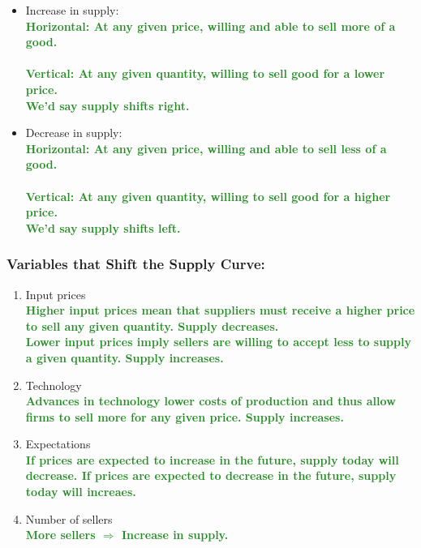 \documentclass[11pt]{article}\usepackage[]{graphicx}\usepackage[]{color}
\theoremstyle{definition}
\newcommand{\ddp}[1]{{\textbf{\textcolor{ForestGreen}{#1}}}}
\begin{document}
	\begin{itemize}
		\setlength{\itemsep}{1.5em}
		\item Increase in supply: \ddp{\\ Horizontal: At any given price, willing and able to sell more of a good. \\ \\
			Vertical: At any given quantity, willing to sell good for a lower price. \\ We'd say supply shifts right.}
		\item Decrease in supply: \ddp{\\ Horizontal: At any given price, willing and able to sell less of a good. \\ \\
			Vertical: At any given quantity, willing to sell good for a higher price. \\ We'd say supply shifts left.}
	\end{itemize}
	\vspace{.5em}
	
	\subsubsection*{Variables that Shift the Supply Curve:}
	
	\begin{enumerate}
		\setlength{\itemsep}{15pt}
		\item Input prices \ddp{\\ Higher input prices mean that suppliers must receive a higher price to sell any given quantity. Supply decreases. \\ Lower input prices imply sellers are willing to accept less to supply a given quantity. Supply increases.}
		\item Technology \ddp{\\ Advances in technology lower costs of production and thus allow firms to sell more for any given price. Supply increases.}
		\item Expectations \ddp{\\ If prices are expected to increase in the future, supply today will decrease. If prices are expected to decrease in the future, supply today will increaes.}
		\item Number of sellers \ddp{\\ More sellers $\Rightarrow$ Increase in supply.}
	\end{enumerate}
	
\end{document}
